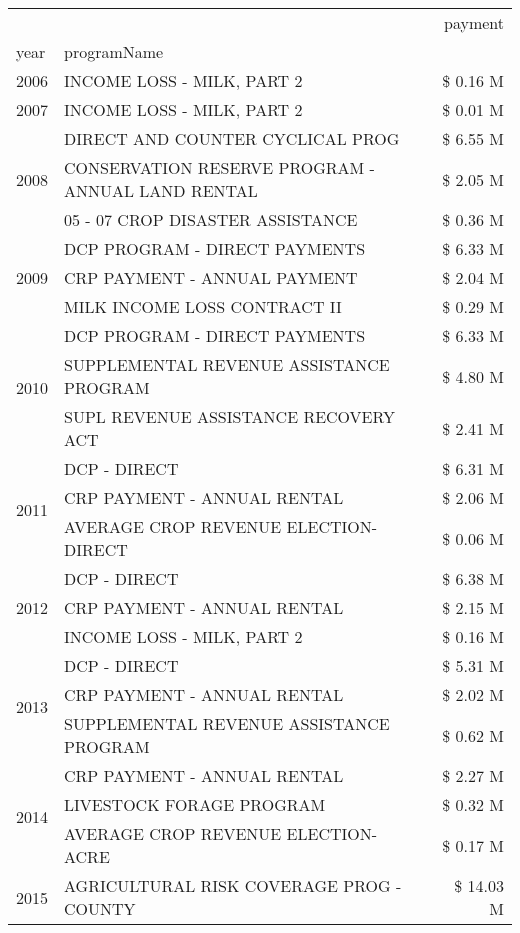 \begin{tabular}{llr}
\toprule
 &  & payment \\
year & programName &  \\
\midrule
2006 & INCOME LOSS - MILK, PART 2 & \$ 0.16 M \\
\cline{1-3}
2007 & INCOME LOSS - MILK, PART 2 & \$ 0.01 M \\
\cline{1-3}
\multirow[t]{3}{*}{2008} & DIRECT AND COUNTER CYCLICAL PROG & \$ 6.55 M \\
 & CONSERVATION RESERVE PROGRAM - ANNUAL LAND RENTAL & \$ 2.05 M \\
 & 05 - 07 CROP DISASTER ASSISTANCE & \$ 0.36 M \\
\cline{1-3}
\multirow[t]{3}{*}{2009} & DCP PROGRAM - DIRECT PAYMENTS & \$ 6.33 M \\
 & CRP PAYMENT - ANNUAL PAYMENT & \$ 2.04 M \\
 & MILK INCOME LOSS CONTRACT II & \$ 0.29 M \\
\cline{1-3}
\multirow[t]{3}{*}{2010} & DCP PROGRAM - DIRECT PAYMENTS & \$ 6.33 M \\
 & SUPPLEMENTAL REVENUE ASSISTANCE PROGRAM & \$ 4.80 M \\
 & SUPL REVENUE ASSISTANCE RECOVERY ACT & \$ 2.41 M \\
\cline{1-3}
\multirow[t]{3}{*}{2011} & DCP - DIRECT & \$ 6.31 M \\
 & CRP PAYMENT - ANNUAL RENTAL & \$ 2.06 M \\
 & AVERAGE CROP REVENUE ELECTION-DIRECT & \$ 0.06 M \\
\cline{1-3}
\multirow[t]{3}{*}{2012} & DCP - DIRECT & \$ 6.38 M \\
 & CRP PAYMENT - ANNUAL RENTAL & \$ 2.15 M \\
 & INCOME LOSS - MILK, PART 2 & \$ 0.16 M \\
\cline{1-3}
\multirow[t]{3}{*}{2013} & DCP - DIRECT & \$ 5.31 M \\
 & CRP PAYMENT - ANNUAL RENTAL & \$ 2.02 M \\
 & SUPPLEMENTAL REVENUE ASSISTANCE PROGRAM & \$ 0.62 M \\
\cline{1-3}
\multirow[t]{3}{*}{2014} & CRP PAYMENT - ANNUAL RENTAL & \$ 2.27 M \\
 & LIVESTOCK FORAGE PROGRAM & \$ 0.32 M \\
 & AVERAGE CROP REVENUE ELECTION-ACRE & \$ 0.17 M \\
\cline{1-3}
\multirow[t]{3}{*}{2015} & AGRICULTURAL RISK COVERAGE PROG - COUNTY & \$ 14.03 M \\

\end{tabular}
